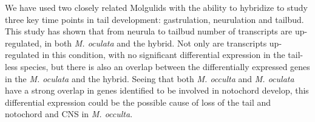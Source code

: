 We have used two closely related Molgulids with the ability to hybridize to study three key time points in tail development: gastrulation, neurulation and tailbud. This study has shown that from neurula to tailbud number of transcripts are up-regulated, in both \textit{M. oculata} and the hybrid. Not only are transcripts up-regulated in this condition, with no significant differential expression in the tail-less species, but there is also an overlap between the differentially expressed genes in the \textit{M. oculata} and the hybrid. Seeing that both \textit{M. occulta} and \textit{M. oculata} have a strong overlap in genes identified to be involved in notochord develop, this differential expression could be the possible cause of loss of the tail and notochord and CNS in \textit{M. occulta}.
